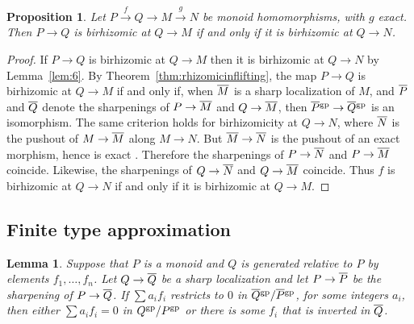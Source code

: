 \documentclass[10pt]{article}
\numberwithin{equation}{section}
\newtheorem{proposition}[paragraph]{Proposition}
\newtheorem{lemma}[paragraph]{Lemma}
\theoremstyle{definition}
\theoremstyle{remark}
\renewcommand{\bar}[1]{\overnorm{#1}\vphantom{#1}}
\def\overnorm#1{\overline{#1}\vphantom{#1}}
\begin{document}
\begin{proposition} \label{prop:2}
	Let $P \xrightarrow f Q \to M \xrightarrow g N$ be monoid homomorphisms, with $g$ exact.  Then $P \to Q$ is birhizomic at $Q \to M$ if and only if it is birhizomic at $Q \to N$.
\end{proposition}





\begin{proof}
	If $P \to Q$ is birhizomic at $Q \to M$ then it is birhizomic at $Q \to N$ by Lemma~\ref{lem:6}.  By Theorem~\ref{thm:rhizomicinflifting}, the map $P \to Q$ is birhizomic at $Q \to M$ if and only if, when $\bar M$ is a sharp localization of $M$, and $\bar P$ and $\bar Q$ denote the sharpenings of $P \to \bar M$ and $Q \to \bar M$, then $\bar P^{\rm gp} \to \bar Q^{\rm gp}$ is an isomorphism.  The same criterion holds for birhizomicity at $Q \to N$, where $\bar N$ is the pushout of $M \to \bar M$ along $M \to N$.  But $\bar M \to \bar N$ is the pushout of an exact morphism, hence is exact \cite[Proposition~I.3.2~(2)]{Tsuji}.  Therefore the sharpenings of $P \to \bar N$ and $P \to \bar M$ coincide.  Likewise, the sharpenings of $Q \to \bar N$ and $Q \to \bar M$ coincide.  Thus $f$ is birhizomic at $Q \to N$ if and only if it is birhizomic at $Q \to M$.
\end{proof}







\subsection{Finite type approximation}

\begin{lemma} \label{lem:15}
	Suppose that $P$ is a monoid and $Q$ is generated relative to $P$ by elements $f_1, \ldots, f_n$.  Let $Q \to \bar Q$ be a sharp localization and let $P \to \bar P$ be the sharpening of $P \to \bar Q$.  If $\sum a_i f_i$ restricts to $0$ in $\bar Q^{\rm gp} / \bar P^{\rm gp}$, for some integers $a_i$, then either $\sum a_i f_i = 0$ in $Q^{\rm gp} / P^{\rm gp}$ or there is some $f_i$ that is inverted in $\bar Q$.
\end{lemma}
\end{document}
